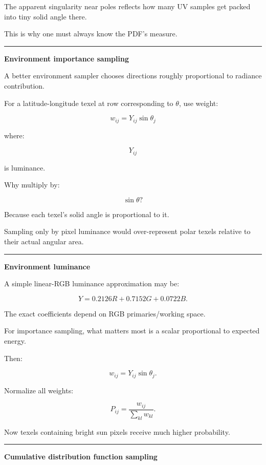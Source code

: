 The apparent singularity near poles reflects how many UV samples get packed into tiny solid angle there.

This is why one must always know the PDF's measure.

\begin{center}\rule{0.5\linewidth}{0.5pt}\end{center}

\textbf{Environment importance sampling}

A better environment sampler chooses directions roughly proportional to radiance contribution.

For a latitude-longitude texel at row corresponding to \(\theta\), use weight:

\[
\boxed{
w_{ij}
=
Y_{ij}
\sin\theta_j
}
\]

where:

\[
Y_{ij}
\]

is luminance.

Why multiply by:

\[
\sin\theta?
\]

Because each texel's solid angle is proportional to it.

Sampling only by pixel luminance would over-represent polar texels relative to their actual angular area.

\begin{center}\rule{0.5\linewidth}{0.5pt}\end{center}

\textbf{Environment luminance}

A simple linear-RGB luminance approximation may be:

\[
Y
=
0.2126R+
0.7152G+
0.0722B.
\]

The exact coefficients depend on RGB primaries/working space.

For importance sampling, what matters most is a scalar proportional to expected energy.

Then:

\[
w_{ij}
=
Y_{ij}\sin\theta_j.
\]

Normalize all weights:

\[
P_{ij}
=
\frac{
w_{ij}
}{
\sum_{kl}w_{kl}
}.
\]

Now texels containing bright sun pixels receive much higher probability.

\begin{center}\rule{0.5\linewidth}{0.5pt}\end{center}

\textbf{Cumulative distribution function sampling}


